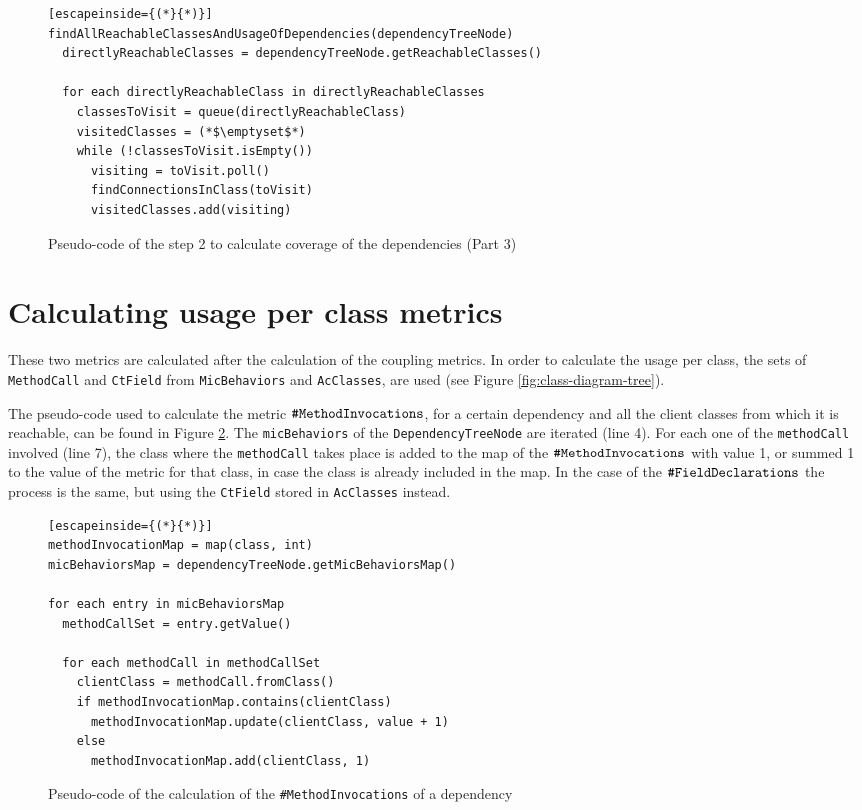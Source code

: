 \begin{figure}[ht!]
\begin{lstlisting}[escapeinside={(*}{*)}]
findAllReachableClassesAndUsageOfDependencies(dependencyTreeNode)
  directlyReachableClasses = dependencyTreeNode.getReachableClasses()

  for each directlyReachableClass in directlyReachableClasses
    classesToVisit = queue(directlyReachableClass)
    visitedClasses = (*$\emptyset$*)
    while (!classesToVisit.isEmpty())
      visiting = toVisit.poll()
      findConnectionsInClass(toVisit)
      visitedClasses.add(visiting)
\end{lstlisting}
\caption{Pseudo-code of the step 2 to calculate coverage of the dependencies (Part 3)}
\label{fig:algorithm-usage-step2-3}
\end{figure}

\section{Calculating usage per class metrics}
These two metrics are calculated after the calculation of the coupling metrics. In order to calculate the usage per class, the sets of \texttt{MethodCall} and \texttt{CtField} from \texttt{MicBehaviors} and \texttt{AcClasses}, are used (see Figure \ref{fig:class-diagram-tree}).

The pseudo-code used to calculate the metric $\verb|#MethodInvocations|$, for a certain dependency and all the client classes from which it is reachable, can be found in Figure \ref{fig:algorithm-method-invocations}. The \texttt{micBehaviors} of the \texttt{DependencyTreeNode} are iterated (line 4). For each one of the \texttt{methodCall} involved (line 7), the class where the \texttt{methodCall} takes place is added to the map of the $\verb|#MethodInvocations|$ with value 1, or summed 1 to the value of the metric for that class, in case the class is already included in the map. In the case of the $\verb|#FieldDeclarations|$ the process is the same, but using the \texttt{CtField} stored in \texttt{AcClasses} instead.

\begin{figure}[ht!]
\begin{lstlisting}[escapeinside={(*}{*)}]
methodInvocationMap = map(class, int)
micBehaviorsMap = dependencyTreeNode.getMicBehaviorsMap()

for each entry in micBehaviorsMap
  methodCallSet = entry.getValue()

  for each methodCall in methodCallSet
    clientClass = methodCall.fromClass()
    if methodInvocationMap.contains(clientClass)
      methodInvocationMap.update(clientClass, value + 1)
    else
      methodInvocationMap.add(clientClass, 1)
\end{lstlisting}
\caption{Pseudo-code of the calculation of the \texttt{\#MethodInvocations} of a dependency}
\label{fig:algorithm-method-invocations}
\end{figure}

